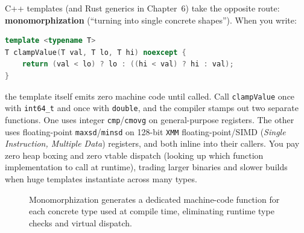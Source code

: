 C++ templates (and Rust generics in Chapter~6) take the opposite route: \textbf{monomorphization} (``turning into single concrete shapes''). When you write:

\begin{lstlisting}[language=C++]
template <typename T>
T clampValue(T val, T lo, T hi) noexcept {
    return (val < lo) ? lo : ((hi < val) ? hi : val);
}
\end{lstlisting}

the template itself emits zero machine code until called. Call \texttt{clampValue} once with \texttt{int64\_t} and once with \texttt{double}, and the compiler stamps out two separate functions. One uses integer \texttt{cmp}/\texttt{cmovg} on general-purpose registers. The other uses floating-point \texttt{maxsd}/\texttt{minsd} on 128-bit \texttt{XMM} floating-point/SIMD (\emph{Single Instruction, Multiple Data}) registers, and both inline into their callers. You pay zero heap boxing and zero vtable dispatch (looking up which function implementation to call at runtime), trading larger binaries and slower builds when huge templates instantiate across many types.

\begin{figure}[htbp]
\centering
{}
\caption{Monomorphization generates a dedicated machine-code function for each concrete type used at compile time, eliminating runtime type checks and virtual dispatch.}
\label{fig:monomorphization}
\end{figure}


